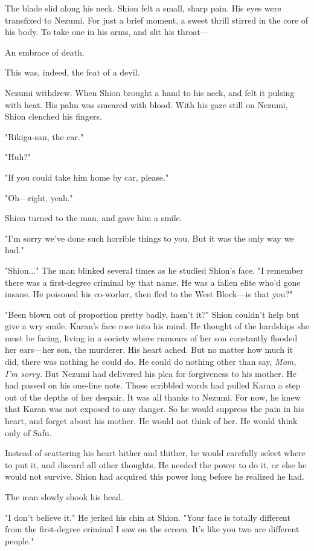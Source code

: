 The blade slid along his neck. Shion felt a small, sharp pain. His eyes
were transfixed to Nezumi. For just a brief moment, a sweet thrill
stirred in the core of his body. To take one in his arms, and slit his
throat---

An embrace of death.

This was, indeed, the feat of a devil.

Nezumi withdrew. When Shion brought a hand to his neck, and felt it
pulsing with heat. His palm was smeared with blood. With his gaze still
on Nezumi, Shion clenched his fingers.

"Rikiga-san, the car."

"Huh?"

"If you could take him home by car, please."

"Oh---right, yeah."

Shion turned to the man, and gave him a smile.

"I'm sorry we've done such horrible things to you. But it was the only
way we had."

"Shion..." The man blinked several times as he studied Shion's face. "I
remember there was a first-degree criminal by that name. He was a fallen
elite who'd gone insane. He poisoned his co-worker, then fled to the
West Block---is that you?"

"Been blown out of proportion pretty badly, hasn't it?" Shion couldn't
help but give a wry smile. Karan's face rose into his mind. He thought
of the hardships she must be facing, living in a society where rumours
of her son constantly flooded her ears---her son, the murderer. His heart
ached. But no matter how much it did, there was nothing he could do. He
could do nothing other than say, \emph{Mom, I'm sorry.} But Nezumi had
delivered his plea for forgiveness to his mother. He had passed on his
one-line note. Those scribbled words had pulled Karan a step out of the
depths of her despair. It was all thanks to Nezumi. For now, he knew
that Karan was not exposed to any danger. So he would suppress the pain
in his heart, and forget about his mother. He would not think of her. He
would think only of Safu.

Instead of scattering his heart hither and thither, he would carefully
select where to put it, and discard all other thoughts. He needed the
power to do it, or else he would not survive. Shion had acquired this
power long before he realized he had.

The man slowly shook his head.

"I don't believe it." He jerked his chin at Shion. "Your face is totally
different from the first-degree criminal I saw on the screen. It's like
you two are different people."

